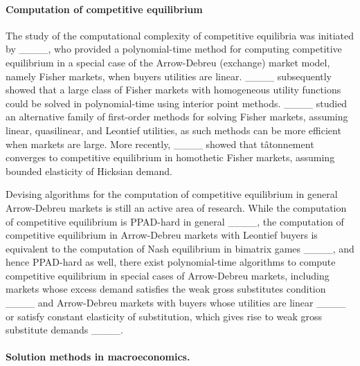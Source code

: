 \paragraph{Computation of competitive equilibrium}
The study of the computational complexity of competitive equilibria was initiated by ____, who provided a polynomial-time method for computing competitive equilibrium in a special case of the Arrow-Debreu (exchange) market model, namely Fisher markets, when buyers utilities are linear.
____ subsequently showed that a large class of Fisher markets with homogeneous utility functions could be solved in polynomial-time using interior point methods.
____ studied an alternative family of first-order methods for solving Fisher markets, assuming linear, quasilinear, and Leontief utilities, as such methods can be more efficient when markets are large. 
More recently, ____ showed that t\^atonnement converges to competitive equilibrium in homothetic Fisher markets, assuming bounded elasticity of Hicksian demand.

Devising algorithms for the computation of competitive equilibrium in general Arrow-Debreu markets is still an active area of research.
While the computation of competitive equilibrium is PPAD-hard in general ____, the computation of competitive equilibrium in Arrow-Debreu markets with Leontief buyers is equivalent to the computation of Nash equilibrium in bimatrix games ____, and hence PPAD-hard as well, there exist polynomial-time algorithms to compute competitive equilibrium in special cases of Arrow-Debreu markets, including markets whose excess demand satisfies the weak gross substitutes condition ____ and Arrow-Debreu markets with buyers whose utilities are linear ____ or satisfy constant elasticity of substitution, which gives rise to weak gross substitute demands ____.



\paragraph{Solution methods in macroeconomics.}

